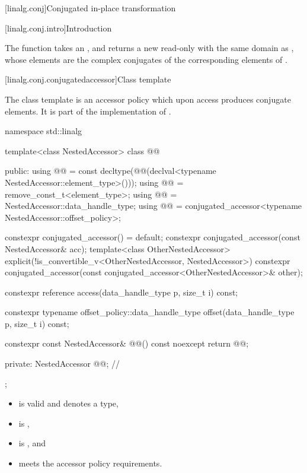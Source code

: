 [linalg.conj]{Conjugated in-place transformation}

[linalg.conj.intro]{Introduction}

\pnum
The  function takes an  ,
and returns a new read-only  
with the same domain as ,
whose elements are the complex conjugates
of the corresponding elements of .

[linalg.conj.conjugatedaccessor]{Class template }

\pnum
The class template 
is an  accessor policy
which upon access produces conjugate elements.
It is part of the implementation of
.

\begin{codeblock}
namespace std::linalg {
  template<class NestedAccessor>
  class @@ {
  public:
    using @@ =
      const decltype(@@(declval<typename NestedAccessor::element_type>()));
    using @@ = remove_const_t<element_type>;
    using @@ = NestedAccessor::data_handle_type;
    using @@ = conjugated_accessor<typename NestedAccessor::offset_policy>;

    constexpr conjugated_accessor() = default;
    constexpr conjugated_accessor(const NestedAccessor& acc);
    template<class OtherNestedAccessor>
      explicit(!is_convertible_v<OtherNestedAccessor, NestedAccessor>)
      constexpr conjugated_accessor(const conjugated_accessor<OtherNestedAccessor>& other);

    constexpr reference access(data_handle_type p, size_t i) const;

    constexpr typename offset_policy::data_handle_type
      offset(data_handle_type p, size_t i) const;

    constexpr const NestedAccessor& @@() const noexcept { return @@; }

  private:
    NestedAccessor @@{};                           // \expos
  };
}
\end{codeblock}

\pnum
\mandates
\begin{itemize}
\item
{} is valid and denotes a type,
\item
{} is ,
\item
{} is , and
\item
{} meets the accessor policy requirements.
\end{itemize}

